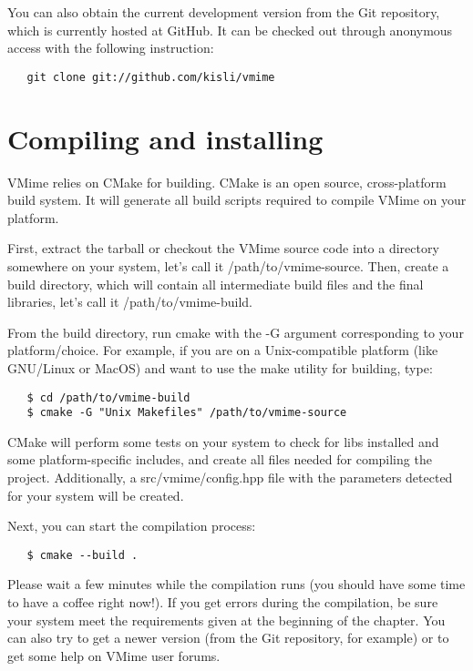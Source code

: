 You can also obtain the current development version from the Git repository,
which is currently hosted at GitHub. It can be checked out through anonymous
access with the following instruction:

\begin{verbatim}
   git clone git://github.com/kisli/vmime
\end{verbatim}

\section{Compiling and installing}

VMime relies on CMake for building. CMake is an open source, cross-platform
build system. It will generate all build scripts required to compile VMime on
your platform.

First, extract the tarball or checkout the VMime source code into a directory
somewhere on your system, let's call it {\vcode /path/to/vmime-source}. Then,
create a build directory, which will contain all intermediate build files and
the final libraries, let's call it {\vcode /path/to/vmime-build}.

From the build directory, run {\vcode cmake} with the {\vcode -G} argument
corresponding to your platform/choice. For example, if you are on a
Unix-compatible platform (like GNU/Linux or MacOS) and want to use the
{\vcode make} utility for building, type:

\begin{verbatim}
   $ cd /path/to/vmime-build
   $ cmake -G "Unix Makefiles" /path/to/vmime-source
\end{verbatim}

CMake will perform some tests on your system to check for libs installed
and some platform-specific includes, and create all files needed for
compiling the project. Additionally, a {\vcode src/vmime/config.hpp} file
with the parameters detected for your system will be created.

Next, you can start the compilation process:

\begin{verbatim}
   $ cmake --build .
\end{verbatim}

Please wait a few minutes while the compilation runs (you should have some
time to have a coffee right now!). If you get errors during the compilation,
be sure your system meet the requirements given at the beginning of the
chapter. You can also try to get a newer version (from the Git repository, for
example) or to get some help on VMime user forums.

